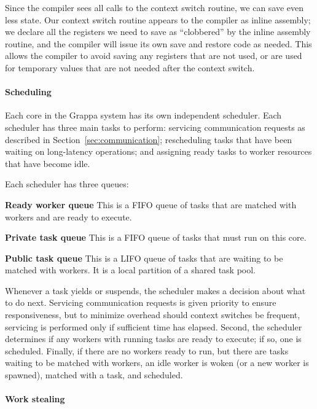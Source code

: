 Since the compiler sees all calls to the context switch routine, we
can save even less state. Our context switch routine appears to the
compiler as inline assembly; we declare all the registers we need
to save as ``clobbered'' by the inline assembly routine, and the
compiler will issue its own save and restore code as needed. This allows the
compiler to avoid saving any registers that are not used, or are used
for temporary values that are not needed after the context switch.

\paragraph{Scheduling} Each core in the Grappa system has its own
independent scheduler. Each scheduler has three main tasks to perform:
servicing communication requests as described in
Section~\ref{sec:communication}; rescheduling tasks that have been
waiting on long-latency operations; and assigning ready tasks to
worker resources that have become idle.

Each scheduler has three queues:
\begin{description}
\item{\bf Ready worker queue} This is a FIFO queue of tasks that are
  matched with workers and are ready to execute.
\item{\bf Private task queue} This is a FIFO queue of tasks that must run on this core.
\item{\bf Public task queue} This is a LIFO queue of tasks that are
  waiting to be matched with workers. It is a local partition of a shared
  task pool.
\end{description}


Whenever a task yields or suspends, the scheduler makes a decision
about what to do next. Servicing communication requests is given priority
to ensure responsiveness, but to minimize overhead should context switches be frequent, servicing is performed only if sufficient time has elapsed.
Second, the scheduler determines if any workers with running tasks are
ready to execute; if so, one is scheduled. Finally, if there are no
workers ready to run, but there are tasks waiting to be matched with
workers, an idle worker is woken (or a new worker is spawned), matched
with a task, and scheduled.

\paragraph{Work stealing} 

